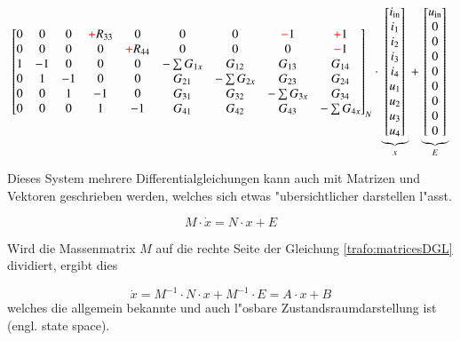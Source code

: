 \begin{refsection}
{\begin{align}
{\begin{bmatrix}
			0&0&0&\color{red}+\color{black}R_{33}&0 & 0&0&\color{red}-\color{black}1&\color{red}+\color{black}1 \\
			0&0&0&0&\color{red}+\color{black}R_{44} & 0&0&0&\color{red}-\color{black}1 \\
			1&-1&0&0&0 & -\sum G_{1x}&G_{12}&G_{13}&G_{14} \\
			0&1&-1&0&0 & G_{21} &- \sum G_{2x}& G_{23}& G_{24} \\
			0&0&1&-1&0 & G_{31} & G_{32} &-\sum G_{3x}&G_{34} \\
			0&0&0&1&-1 & G_{41}&G_{42}&G_{43}&-\sum G_{4x}
			\end{bmatrix}}_{\text{$N$}}
			\cdot
			\underbrace{\begin{bmatrix}
			i_\mathrm{in} \\
			i_1 \\
			i_2 \\
			i_3 \\
			i_4 \\
			u_1 \\
			u_2 \\
			u_3 \\
			u_4
			\end{bmatrix}}_{\text{$x$}}
			+
			\underbrace{\begin{bmatrix}
			u_\mathrm{in} \\
			0 \\
			0 \\
			0 \\
			0 \\
			0 \\
			0 \\
			0 \\
			0
			\end{bmatrix}}_{\text{$E$}}
			\label{trafo:symmetricalDGL}
\end{align}
}

Dieses System mehrere Differentialgleichungen kann auch mit Matrizen und Vektoren geschrieben werden, welches sich etwas "ubersichtlicher darstellen l"asst. 

\begin{equation}
	M \cdot \dot x = N \cdot x + E
	\label{trafo:matricesDGL}
\end{equation}

Wird die Massenmatrix $M$ auf die rechte Seite der Gleichung \ref{trafo:matricesDGL} dividiert, ergibt dies

\begin{equation}
	\dot{x} = M^{-1} \cdot N \cdot x + M^{-1} \cdot E = A \cdot x + B
\end{equation}
welches die allgemein bekannte und auch l"osbare Zustandsraumdarstellung  ist (engl. state space).


\end{refsection}
